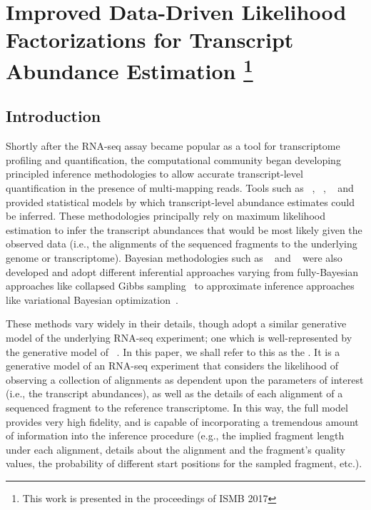 
\renewcommand{\thechapter}{3}

\chapter[Data-Driven Likelihood Factorizations]{Improved Data-Driven 
Likelihood Factorizations for Transcript Abundance Estimation
\footnote{This work is presented in the proceedings of ISMB 2017}} 
\label{chapt3}

\section{Introduction}

Shortly after the RNA-seq assay became popular as a tool for transcriptome profiling and 
quantification, the computational community began developing principled inference 
methodologies to allow accurate transcript-level quantification in the presence of 
multi-mapping reads.  Tools such as \cufflinks~\citep{cufflinks}, \rsem~\citep{Li2010RSEM}, 
\mmseq~\citep{Turro2011Haplotype} and \isoem~\citep{Nicolae2011Estimation} provided 
statistical models by which transcript-level abundance estimates could be inferred. 
These methodologies principally rely on maximum likelihood estimation to infer the 
transcript abundances that would be most likely given the observed data (i.e., the 
alignments of the sequenced fragments to the underlying genome or transcriptome). 
Bayesian methodologies such as \bitseq~\citep{bitseq} and \tigar~\citep{tigar} were 
also developed and adopt different inferential approaches varying from fully-Bayesian 
approaches like collapsed Gibbs sampling~\citep{bitseq} to approximate inference 
approaches like variational Bayesian optimization~\citep{tigar,tigar2,bitseqvb}.

These methods vary widely in their details, though adopt a similar 
generative model of the underlying RNA-seq experiment; one which is well-represented 
by the generative model of \rsem~\citep{Li2010RSEM,rsembmc}.  In this paper, we shall 
refer to this as the \fm.  It is a generative model of an RNA-seq experiment that 
considers the likelihood of observing a collection of alignments as dependent upon 
the parameters of interest (i.e., the transcript abundances), as well as the details 
of each alignment of a sequenced fragment to the reference transcriptome.  In this way, 
the full model provides very high fidelity, and is capable of incorporating a tremendous 
amount of information into the inference procedure (e.g., the implied fragment length 
under each alignment, details about the alignment and the fragment's quality values, 
the probability of different start positions for the sampled fragment, etc.).

